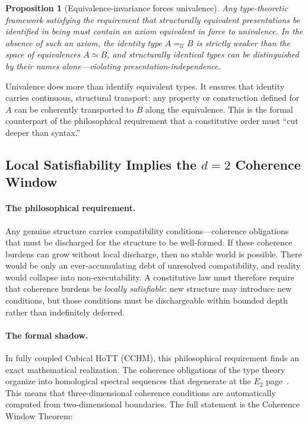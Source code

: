 \documentclass[11pt,a4paper]{article}
\theoremstyle{plain}
\newtheorem{proposition}[theorem]{Proposition}
\theoremstyle{definition}
\theoremstyle{remark}
\newcommand{\U}{\mathcal{U}}
\begin{document}
\begin{proposition}[Equivalence-invariance forces univalence]
\label{prop:univalence}
Any type-theoretic framework satisfying the requirement that structurally equivalent presentations be identified in being must contain an axiom equivalent in force to univalence.  In the absence of such an axiom, the identity type $A =_{\U} B$ is strictly weaker than the space of equivalences $A \simeq B$, and structurally identical types can be distinguished by their names alone---violating presentation-independence.
\end{proposition}

Univalence does more than identify equivalent types.  It ensures that identity carries continuous, structural transport: any property or construction defined for $A$ can be coherently transported to $B$ along the equivalence.  This is the formal counterpart of the philosophical requirement that a constitutive order must ``cut deeper than syntax.''


\subsection{Local Satisfiability Implies the \texorpdfstring{$d=2$}{d=2} Coherence Window}
\label{sec:d2}

\paragraph{The philosophical requirement.}
Any genuine structure carries compatibility conditions---coherence obligations that must be discharged for the structure to be well-formed.  If these coherence burdens can grow without local discharge, then no stable world is possible.  There would be only an ever-accumulating debt of unresolved compatibility, and reality would collapse into non-executability.  A constitutive law must therefore require that coherence burdens be \emph{locally satisfiable}: new structure may introduce new conditions, but those conditions must be dischargeable within bounded depth rather than indefinitely deferred.

\paragraph{The formal shadow.}
In fully coupled Cubical HoTT (CCHM), this philosophical requirement finds an exact mathematical realization.  The coherence obligations of the type theory organize into homological spectral sequences that degenerate at the $E_2$ page~\cite{pen2026}.  This means that three-dimensional coherence conditions are automatically computed from two-dimensional boundaries.  The full statement is the Coherence Window Theorem:
\end{document}
